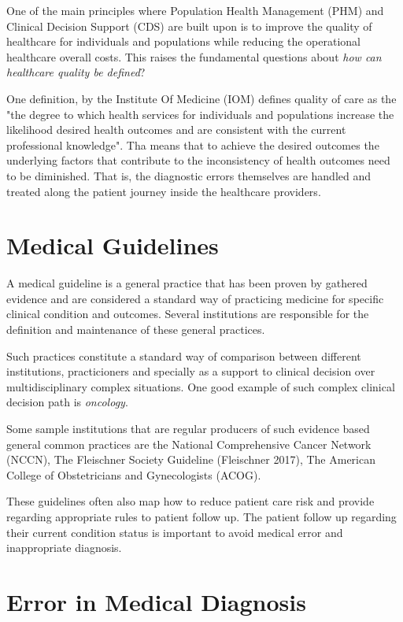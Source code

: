 \label{chap:introduction}

One of the main principles where Population Health Management (PHM) and Clinical Decision Support (CDS) are built upon is to improve the quality of healthcare for individuals and populations while reducing the operational healthcare overall costs. This raises the fundamental questions about \emph{how can healthcare quality be defined}?

One definition, by the Institute Of Medicine (IOM)\cite{iom2000} defines quality of care as the "the degree to which health services for individuals and populations increase the likelihood desired health outcomes and are consistent with the current professional knowledge". Tha means that to achieve the desired outcomes the underlying factors that contribute to the inconsistency of health outcomes need to be diminished. That is, the diagnostic errors themselves are handled and treated along the patient journey inside the healthcare providers.

\section{Medical Guidelines}

A medical guideline is a general practice that has been proven by gathered evidence and are considered a standard way of practicing medicine for specific clinical condition and outcomes. Several institutions are responsible for the definition and maintenance of these general practices. 

Such practices constitute a standard way of comparison between different institutions, practicioners and specially as a support to clinical decision over multidisciplinary complex situations. One good example of such complex clinical decision path is \emph{oncology}.

Some sample institutions that are regular producers of such evidence based general common practices are the National Comprehensive Cancer Network (NCCN)\cite{nccn2019}, The Fleischner Society Guideline (Fleischner 2017)\cite{fleischner2017}, The American College of Obstetricians and Gynecologists (ACOG)\cite{acog2019}.

These guidelines often also map how to reduce patient care risk and provide regarding appropriate rules to patient follow up. The patient follow up regarding their current condition status is important to avoid medical error and inappropriate diagnosis.

\section{Error in Medical Diagnosis}

